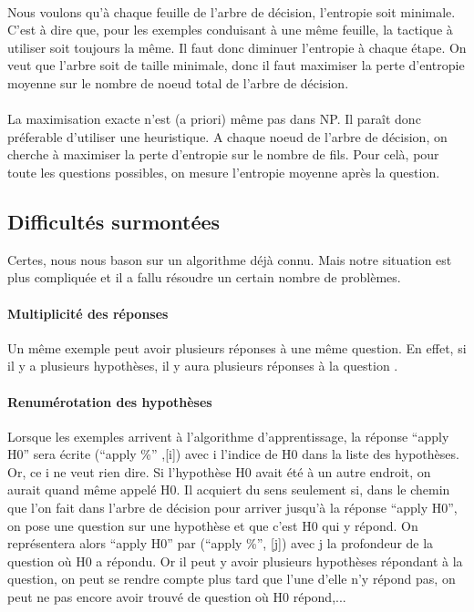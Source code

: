 \paragraph{}Nous voulons qu'à chaque feuille de l'arbre de décision, l'entropie soit minimale. C'est à dire que, pour les exemples conduisant à une même feuille, la tactique à utiliser soit toujours la même. Il faut donc diminuer l'entropie à chaque étape. On veut que l'arbre soit de taille minimale, donc il faut maximiser la perte d'entropie moyenne sur le nombre de noeud total de l'arbre de décision.

\paragraph{}
La maximisation exacte n'est (a priori) même pas dans NP. Il paraît donc préferable d'utiliser une heuristique. A chaque noeud de l'arbre de décision, on cherche à maximiser la perte d'entropie sur le nombre de fils. Pour celà, pour toute les questions possibles, on mesure l'entropie moyenne après la question.

\subsection*{Difficultés surmontées}
Certes, nous nous bason sur un algorithme déjà connu. Mais notre situation est plus compliquée et il a fallu résoudre un certain nombre de problèmes.

\paragraph{Multiplicité des réponses} Un même exemple peut avoir plusieurs réponses à une même question. En effet, si il y a plusieurs hypothèses, il y aura plusieurs réponses à la question .
\paragraph{Renumérotation des hypothèses} Lorsque les exemples arrivent à l'algorithme d'apprentissage, la réponse ``apply H0'' sera écrite (``apply \%'' ,[i]) avec i l'indice de H0 dans la liste des hypothèses. Or, ce i ne veut rien dire. Si l'hypothèse H0 avait été à un autre endroit, on aurait quand même appelé H0. Il acquiert du sens seulement si, dans le chemin que l'on fait dans l'arbre de décision pour arriver jusqu'à la réponse ``apply H0'', on pose une question sur une hypothèse et que c'est H0 qui y répond. On représentera alors ``apply H0'' par (``apply \%'', [j]) avec j la profondeur de la question où H0 a répondu. Or il peut y avoir plusieurs hypothèses répondant à la question, on peut se rendre compte plus tard que l'une d'elle n'y répond pas, on peut ne pas encore avoir trouvé de question où H0 répond,...
